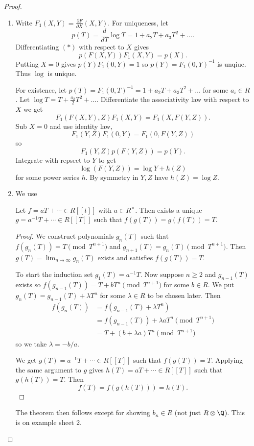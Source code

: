 \documentclass[a4paper]{article}
\theoremstyle{definition}
\theoremstyle{theorem}
\begin{document}
\begin{proof}\leavevmode
  \begin{enumerate}
  \item Write \(F_1(X, Y) = \frac{\partial F}{\partial X}(X, Y)\). For uniqueness, let
    \[
      p(T) = \frac{d}{dT} \log T = 1 + a_2 T + a_3 T^2 + \dots.
    \]
    Differentiating \((\ast)\) with respect to \(X\) gives
    \[
      p(F(X, Y)) F_1(X, Y) = p(X).
    \]
    Putting \(X = 0\) gives \(p(Y) F_1(0, Y) = 1\) so \(p(Y) = F_1(0, Y)^{-1}\) is unqiue. Thus \(\log\) is unique.

    For existence, let \(p(T) = F_1(0, T)^{-1} = 1 + a_2 T + a_3 T^2 + \dots\) for some \(a_i \in R\). Let \(\log T = T + \frac{a_2}{2}T^2 + \dots\). Differentiate the associativity law with respect to \(X\) we get
    \[
      F_1(F(X, Y), Z) F_1(X, Y) = F_1(X, F(Y, Z)).
    \]
    Sub \(X = 0\) and use identity law,
    \[
      F_1(Y, Z) F_1(0, Y) = F_1(0, F(Y, Z))
    \]
    so
    \[
      F_1(Y, Z) p(F(Y, Z)) = p(Y).
    \]
    Integrate with repsect to \(Y\) to get
    \[
      \log (F(Y, Z)) = \log Y + h(Z)
    \]
    for some power series \(h\). By symmetry in \(Y, Z\) have \(h(Z) = \log Z\).
  \item
    We use
    \begin{lemma}
      Let \(f = aT + \cdots \in R[[t]]\) with \(a \in R^\times\). Then exists a unique \(g = a^{-1}T + \cdots \in R[[T]]\) such that \(f(g(T)) = g(f(T)) = T\).
    \end{lemma}

    \begin{proof}
      We construct polynomials \(g_n(T)\) such that \(f(g_n(T)) = T \pmod{T^{n + 1}}\) and \(g_{n + 1}(T) = g_n(T) \pmod{T^{n + 1}}\). Then \(g(T) = \lim_{n \to \infty} g_n(T)\) exists and satisfies \(f(g(T)) = T\).

      To start the induction set \(g_1(T) = a^{-1}T\). Now suppose \(n \geq 2\) and \(g_{n - 1}(T)\) exists so \(f(g_{n - 1}(T)) = T + bT^n \pmod{T^{n + 1}}\) for some \(b \in R\). We put \(g_n(T) = g_{n - 1}(T) + \lambda T^n\) for some \(\lambda \in R\) to be chosen later. Then
      \begin{align*}
        f(g_n(T))
        &= f(g_{n - 1}(T) + \lambda T^n) \\
        &= f(g_{n - 1}(T)) + \lambda aT^n \pmod{T^{n + 1}} \\
        &= T + (b + \lambda a)T^n \pmod{T^{n + 1}}
      \end{align*}
      so we take \(\lambda = -b/a\).

      We get \(g(T) = a^{-1}T + \cdots \in R[[T]]\) such that \(f(g(T)) = T\). Applying the same argument to \(g\) gives \(h(T) = aT + \cdots \in R[[T]]\) such that \(g(h(T)) = T\). Then
      \[
        f(T) = f(g(h(T))) = h(T).
      \]
    \end{proof}
    The theorem then follows except for showing \(b_n \in R\) (not just \(R \otimes \Q\)). This is on example sheet 2.
  \end{enumerate}
\end{proof}
\end{document}
